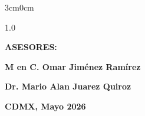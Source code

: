 \begin{titlepage}
\begin{adjustwidth}{3cm}{0cm}
\begin{spacing}{1.0}
    \vspace{0.5cm}
    {\normalsize \bfseries \MakeUppercase{Asesores:} \par}
    \vspace{0.1cm}
    {\normalsize \bfseries M en C. Omar Jiménez Ramírez \par}
    \vspace{0.3cm}
    {\normalsize \bfseries Dr. Mario Alan Juarez Quiroz \par}
    \vspace{0.3cm}
    \vfill
    {\normalsize \bfseries \raggedleft CDMX, Mayo 2026\par}
    \end{spacing}
\end{adjustwidth}
\end{titlepage}